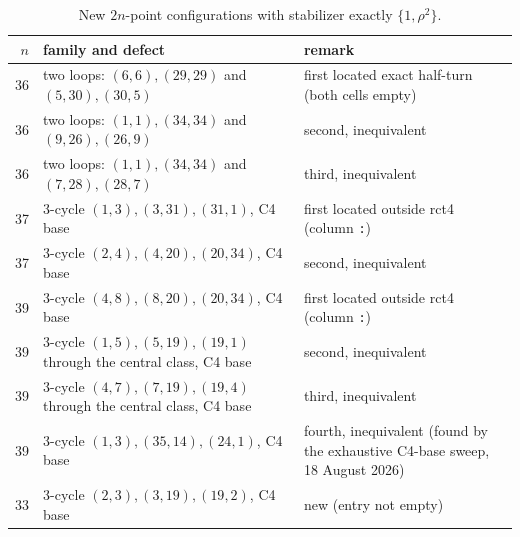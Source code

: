 \documentclass[11pt]{article}
\theoremstyle{remark}
\newcommand{\rot}{\rho}
\begin{document}
\begin{table}[ht]\centering\small
\begin{tabular}{r l l}
\toprule
$n$ & family and defect & remark\\
\midrule
36 & two loops: $(6,6),(29,29)$ and $(5,30),(30,5)$ & first located exact half-turn (both cells empty)\\
36 & two loops: $(1,1),(34,34)$ and $(9,26),(26,9)$ & second, inequivalent\\
36 & two loops: $(1,1),(34,34)$ and $(7,28),(28,7)$ & third, inequivalent\\
37 & 3-cycle $(1,3),(3,31),(31,1)$, C4 base & first located outside rct4 (column \texttt{:})\\
37 & 3-cycle $(2,4),(4,20),(20,34)$, C4 base & second, inequivalent\\
39 & 3-cycle $(4,8),(8,20),(20,34)$, C4 base & first located outside rct4 (column \texttt{:})\\
39 & 3-cycle $(1,5),(5,19),(19,1)$ through the central class, C4 base & second, inequivalent\\
39 & 3-cycle $(4,7),(7,19),(19,4)$ through the central class, C4 base & third, inequivalent\\
39 & 3-cycle $(1,3),(35,14),(24,1)$, C4 base & fourth, inequivalent (found by the exhaustive C4-base sweep, 18 August 2026)\\
33 & 3-cycle $(2,3),(3,19),(19,2)$, C4 base & new (entry not empty)\\
\bottomrule
\end{tabular}
\caption{New $2n$-point configurations with stabilizer exactly $\{1,\rot^2\}$.}\label{tab:new}
\end{table}
\end{document}
